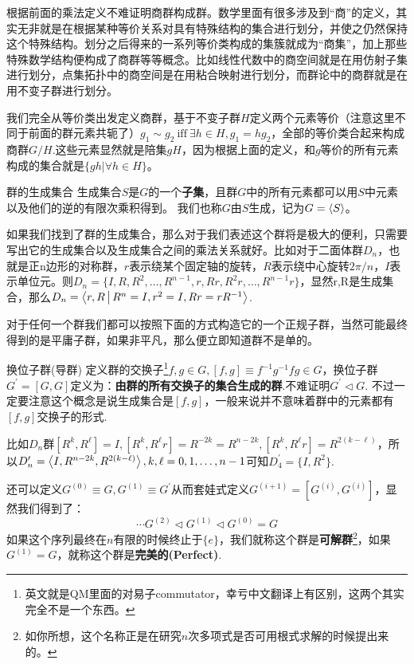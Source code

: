 根据前面的乘法定义不难证明商群构成群。数学里面有很多涉及到“商”的定义，其实无非就是在根据某种等价关系对具有特殊结构的集合进行划分，并使之仍然保持这个特殊结构。划分之后得来的一系列等价类构成的集簇就成为“商集”，加上那些特殊数学结构便构成了商群等等概念。比如线性代数中的商空间就是在用仿射子集进行划分，点集拓扑中的商空间是在用粘合映射进行划分，而群论中的商群就是在用不变子群进行划分。

我们完全从等价类出发定义商群，基于不变子群$H$定义两个元素等价（注意这里不同于前面的群元素共轭了）$g_1\sim g_2 {\ }\mathrm{iff}{\ } \exists h\in H, g_1=h g_2$，全部的等价类合起来构成商群$G/H$.这些元素显然就是陪集$gH$，因为根据上面的定义，和$g$等价的所有元素构成的集合就是$\{gh|\forall h\in H\}$。


\begin{define}{群的生成集合}
	生成集合$S$是$G$的一个\textbf{子集}，且群$G$中的所有元素都可以用$S$中元素以及他们的逆的有限次乘积得到。
	我们也称$G$由$S$生成，记为$G=\Braket{S}$。
\end{define}

如果我们找到了群的生成集合，那么对于我们表述这个群将是极大的便利，只需要写出它的生成集合以及生成集合之间的乘法关系就好。比如对于二面体群$D_n$，也就是正n边形的对称群，$r$表示绕某个固定轴的旋转，$R$表示绕中心旋转$2\pi/n$，$I$表示单位元。则$D_n=\{I,R,R^2,\ldots,R^{n-1},r,Rr,R^2r,\ldots,R^{n-1}r\}$，显然{r,R}是生成集合，那么$D_n=\Braket{r,R|R^n=I,r^2=I,Rr=rR^{-1}}$.

对于任何一个群我们都可以按照下面的方式构造它的一个正规子群，当然可能最终得到的是平庸子群，如果非平凡，那么便立即知道群不是单的。
\begin{define}{换位子群(导群)}
	定义群的交换子\footnote{英文就是QM里面的对易子commutator，幸亏中文翻译上有区别，这两个其实完全不是一个东西。}$f,g\in G, [f,g]\equiv f^{-1}g^{-1}fg\in G$，换位子群$G^\prime=[G,G]$定义为：\textbf{由群的所有交换子的集合生成的群}.不难证明$G^\prime\lhd G $. 不过一定要注意这个概念是说生成集合是$[f,g]$，一般来说并不意味着群中的元素都有$[f,g]$交换子的形式.
\end{define}

比如$D_n$群$[R^k,R^\ell]=I,[R^k,R^\ell r]=R^{-2k}=R^{n-2k},[R^k,R^\ell r]=R^{2(k-\ell)}$，所以$D_n^\prime=\Braket{I,R^{n-2k},R^{2(k-\ell)}},k,\ell=0,1,\ldots,n-1$可知$D_4^\prime=\{I,R^2\}$.

还可以定义$G^{(0)}\equiv G,G^{(1)}\equiv G^\prime$从而套娃式定义$G^{(i+1)}=[G^{(i)},G^{(i)}]$，显然我们得到了：
\[\cdots G^{(2)}\lhd  G^{(1)}\lhd  G^{(0)}=G\]
如果这个序列最终在$n$有限的时候终止于$\{e\}$，我们就称这个群是\textbf{可解群}\footnote{如你所想，这个名称正是在研究$n$次多项式是否可用根式求解的时候提出来的。}，如果$G^{(1)}=G$，就称这个群是\textbf{完美的(Perfect)}.

